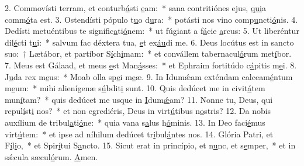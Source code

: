 2. Commovísti terram, et conturb\uline{á}sti \uline{e}am:~* sana contritiónes ejus, \uline{qui}a comm\uline{ó}ta est.
3. Ostendísti pópulo t\uline{u}o d\uline{u}ra:~* potásti nos vino comp\uline{u}ncti\uline{ó}nis.
4. Dedísti metuéntibus te signific\uline{a}ti\uline{ó}nem:~* ut fúgiant a f\uline{á}cie \uline{a}rcus:
5. Ut liberéntur dil\uline{é}cti t\uline{u}i:~* salvum fac déxtera tua, \uline{e}t ex\uline{áu}di me.
6. Deus locútus est in sancto suo:~† Lætábor, et partíbor S\uline{í}ch\uline{i}mam:~* et convállem tabernacul\uline{ó}rum met\uline{í}bor.
7. Meus est Gálaad, et meus \uline{e}st Man\uline{á}sses:~* et Ephraim fortitúdo c\uline{á}pitis m\uline{e}i.
8. J\uline{u}da rex m\uline{e}us:~* Moab olla sp\uline{e}i m\uline{e}æ.
9. In Idumǽam exténdam calceam\uline{é}ntum m\uline{e}um:~* mihi alienígenæ s\uline{ú}bdit\uline{i} sunt.
10. Quis dedúcet me in civit\uline{á}tem mun\uline{í}tam?~* quis dedúcet me usque in \uline{I}dum\uline{ǽ}am?
11. Nonne tu, Deus, qui repul\uline{í}st\uline{i} nos?~* et non egrediéris, Deus in virt\uline{ú}tibus n\uline{o}stris?
12. Da nobis auxílium de tribul\uline{a}ti\uline{ó}ne:~* quia vana s\uline{a}lus h\uline{ó}minis.
13. In Deo faci\uline{é}mus virt\uline{ú}tem:~* et ipse ad níhilum dedúcet tr\uline{i}bul\uline{á}ntes nos.
14. Glória Patri, et F\uline{í}l\uline{i}o,~* et Spir\uline{í}tui S\uline{a}ncto.
15. Sicut erat in princípio, et n\uline{u}nc, et s\uline{e}mper,~* et in sǽcula sæcul\uline{ó}rum. \uline{A}men.
